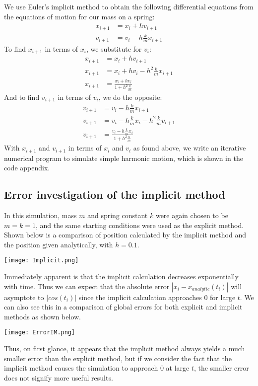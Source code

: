 \documentclass{scrartcl}
\begin{document}
We use Euler's implicit method to obtain the following differential equations from the equations of motion for our mass on a spring:
\begin{align*}
x_{i+1} &= x_i + hv_{i+1} \\ 
v_{i+1} &= v_i - h\frac{k}{m}x_{i+1}
\end{align*}
To find $x_{i+1}$ in terms of $x_{i}$, we substitute for $v_{i}$:
\begin{align*}
x_{i+1} &= x_i + hv_{i+1} \\
x_{i+1} &= x_i + hv_i - h^{2}\frac{k}{m}x_{i+1} \\
x_{i+1} &= \frac{x_i + hv_i}{1+ h^{2}\frac{k}{m}}
\end{align*}
And to find $v_{i+1}$ in terms of $v_{i}$, we do the opposite:
\begin{align*}
v_{i+1} &= v_i - h\frac{k}{m}x_{i+1}\\
v_{i+1} &= v_i - h\frac{k}{m}x_{i} - h^{2}\frac{k}{m}v_{i+1} \\
v_{i+1} &= \frac{v_i - h\frac{k}{m}x_i}{1+ h^{2}\frac{k}{m}}
\end{align*}
With $x_{i+1}$ and $v_{i+1}$ in terms of $x_{i}$ and $v_{i}$ as found above, we write an iterative numerical program to simulate simple harmonic motion, which is shown in the code appendix.
\subsection{Error investigation of the implicit method}
In this simulation, mass $m$ and spring constant $k$ were again chosen to be $m=k=1$, and the same starting conditions were used as the explicit method. Shown below is a comparison of position calculated by the implicit method and the position given analytically, with $h=0.1$.
\begin{center}
\texttt{[image: Implicit.png]}
\end{center}
Immediately apparent is that the implicit calculation decreases exponentially with time. Thus we can expect that the absolute error $|x_i - x_{analytic} (t_i)|$ will asymptote to $|cos(t_{i})|$ since the implicit calculation approaches $0$ for large $t$. We can also see this in a comparison of global errors for both explicit and implicit methods as shown below.
\begin{center}
\texttt{[image: ErrorIM.png]}
\end{center}
Thus, on first glance, it appears that the implicit method always yields a much smaller error than the explicit method, but if we consider the fact that the implicit method causes the simulation to approach $0$ at large $t$, the smaller error does not signify more useful results. \par
\end{document}
